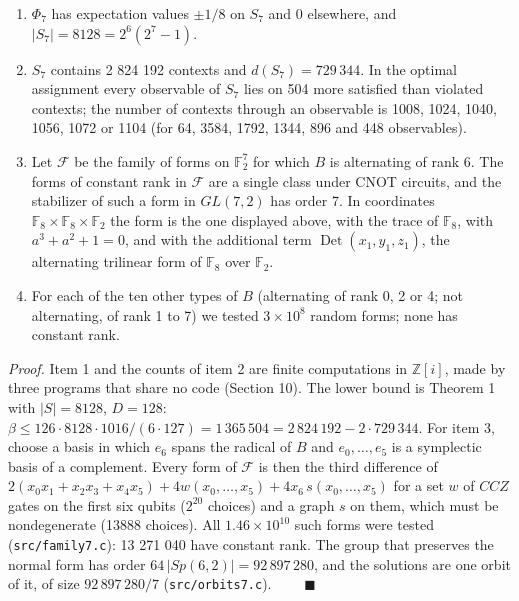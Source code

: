 \documentclass[11pt,a4paper]{article}
\providecommand{\tightlist}{\setlength{\itemsep}{0pt}\setlength{\parskip}{0pt}}
\begin{document}
\begin{enumerate}
\def\labelenumi{\arabic{enumi}.}
\tightlist
\item
  \(\Phi_7\) has expectation values \(\pm 1/8\) on \(S_7\) and \(0\) elsewhere, and \(|S_7| = 8128 = 2^6(2^7-1)\).
\item
  \(S_7\) contains 2 824 192 contexts and \(d(S_7) = 729\,344\). In the optimal assignment every observable
  of \(S_7\) lies on 504 more satisfied than violated contexts; the number of contexts through an
  observable is 1008, 1024, 1040, 1056, 1072 or 1104 (for 64, 3584, 1792, 1344, 896 and 448 observables).
\item
  Let \(\mathcal{F}\) be the family of forms on \(\mathbb{F}_2^7\) for which \(B\) is alternating of rank 6.
  The forms of constant rank in \(\mathcal{F}\) are a single class under CNOT circuits, and the stabilizer
  of such a form in \(GL(7,2)\) has order 7. In coordinates
  \(\mathbb{F}_8 \times \mathbb{F}_8 \times \mathbb{F}_2\) the form is the one displayed above, with the
  trace of \(\mathbb{F}_8\), with \(a^3 + a^2 + 1 = 0\), and with the additional term \(\operatorname{Det}(x_1,y_1,z_1)\),
  the alternating trilinear form of \(\mathbb{F}_8\) over \(\mathbb{F}_2\).
\item
  For each of the ten other types of \(B\) (alternating of rank 0, 2 or 4; not alternating, of rank 1
  to 7) we tested \(3 \times 10^8\) random forms; none has constant rank.
\end{enumerate}

\emph{Proof.} Item 1 and the counts of item 2 are finite computations in \(\mathbb{Z}[i]\), made by three
programs that share no code (Section 10). The lower bound is Theorem 1 with \(|S| = 8128\), \(D = 128\):
\(\beta \le 126 \cdot 8128 \cdot 1016/(6\cdot 127) = 1\,365\,504 = 2\,824\,192 - 2 \cdot 729\,344\). For item 3,
choose a basis in which \(e_6\) spans the radical of \(B\) and \(e_0,\dots,e_5\) is a symplectic basis of a
complement. Every form of \(\mathcal{F}\) is then the third difference of
\(2(x_0x_1 + x_2x_3 + x_4x_5) + 4w(x_0,\dots,x_5) + 4x_6\,s(x_0,\dots,x_5)\) for a set \(w\) of \(CCZ\) gates
on the first six qubits (\(2^{20}\) choices) and a graph \(s\) on them, which must be nondegenerate (13888
choices). All \(1.46 \times 10^{10}\) such forms were tested (\texttt{src/family7.c}): 13 271 040 have constant
rank. The group that preserves the normal form has order \(64\,|Sp(6,2)| = 92\,897\,280\), and the
solutions are one orbit of it, of size \(92\,897\,280/7\) (\texttt{src/orbits7.c}). \(\qquad\blacksquare\)
\end{document}
